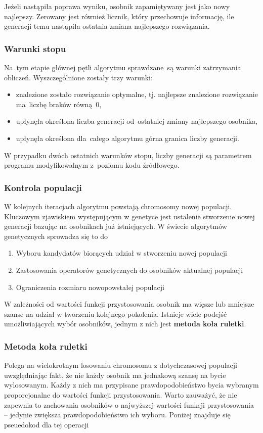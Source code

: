 \documentclass[12pt,a4paper]{article}
\theoremstyle{definition}
\begin{document}
\noindent
Jeżeli nastąpiła poprawa wyniku, osobnik zapamiętywany jest jako nowy najlepszy.
Zerowany jest również licznik, który przechowuje informację, ile generacji temu nastąpiła ostatnia zmiana najlepszego rozwiązania. 

\subsubsection{Warunki stopu}
Na~tym etapie głównej pętli algorytmu sprawdzane~są warunki zatrzymania obliczeń.
Wyszczególnione zostały trzy warunki:
\begin{itemize}
	\item znalezione zostało rozwiązanie optymalne, tj. najlepsze znalezione rozwiązanie ma~liczbę braków równą~0,
	\item upłynęła określona liczba generacji od~ostatniej zmiany najlepszego osobnika,
	\item upłynęła określona dla~całego algorytmu górna granica liczby generacji.
\end{itemize}
W przypadku dwóch ostatnich warunków stopu, liczby generacji są parametrem programu modyfikowalnym z~poziomu kodu źródłowego.

\subsubsection{Kontrola populacji}
W kolejnych iteracjach algorytmu powstają chromosomy nowej populacji. Kluczowym zjawiskiem występującym w genetyce jest ustalenie stworzenie nowej generacji bazując na osobnikach już istniejących. W świecie algorytmów genetycznych sprowadza się to do
\begin{enumerate}
	\item Wyboru kandydatów biorących udział w stworzeniu nowej populacji
	\item Zastosowania operatorów genetycznych do osobników aktualnej populacji
	\item Ograniczenia rozmiaru nowopowstałej populacji
\end{enumerate}
W zależności od wartości funkcji przystosowania osobnik ma więsze lub mniejsze szanse na udział w tworzeniu kolejnego pokolenia. Istnieje wiele podejść umożliwiających wybór osobników, jednym z nich jest \textbf{metoda koła ruletki}.

\subsubsection*{Metoda koła ruletki}
Polega na wielokrotnym losowaniu chromosomu z dotychczasowej populacji uwzględniając fakt, że nie każdy osobnik ma jednakową szansę na bycie wylosowanym. Każdy z nich ma przypisane prawdopodobieństwo bycia wybranym proporcjonalne do wartości funkcji przystosowania. Warto zauważyć, że nie zapewnia to zachowania osobników o najwyższej wartości funkcji przystosowania -- jedynie zwiększa prawdopodobieństwo ich wyboru. Poniżej znajduje się pseuedokod dla tej operacji \\
\end{document}
